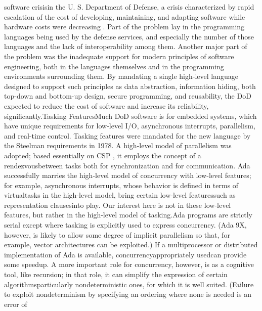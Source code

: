 \ldquo[]software crisis\rdquo[] in the U. S. Department of Defense,
a crisis characterized by rapid escalation of the cost of developing,
maintaining, and adapting software while hardware costs were decreasing
\Endcit[]. Part of the
problem lay in the programming languages being used by the defense
services, and especially the number of those languages and the lack
of interoperability among them. Another major part of the problem
was the inadequate support for modern principles of software engineering,
both in the languages themselves and in the programming environments
surrounding them. By mandating a single high-level language designed
to support such principles as data abstraction, information hiding,
both top-down and bottom-up design, secure programming, and reusability,
the DoD expected to reduce the cost of software and increase its reliability,
significantly.\Endpara[]
\DivLiv[]\HdMinLiv[]Tasking Features\HdMinEndiv[]
\Para[]Much DoD software is for embedded systems, which have unique
requirements for low-level I/O, asynchronous interrupts, parallelism,
and real-time control. Tasking features were mandated for the new
language by the Steelman requirements %
\Endcit[] in 1978. A high-level model of parallelism was adopted;
based essentially on CSP \Endcit[], it
employs the concept of a \txtxemph[]rendezvous\txtxendemph[] between
tasks both for synchronization and for communication. Ada successfully
marries the high-level model of concurrency with low-level features;
for example, asynchronous interrupts, whose behavior is defined in
terms of \ldquo[]virtual\rdquo[] tasks in the high-level model, bring
certain low-level features\EmDash[]such as representation clauses\EmDash[]into
play. Our interest here is not in these low-level features, but rather
in the high-level model of tasking.\Endpara[]
\Para[]Ada programs are strictly serial except where tasking is explicitly
used to express concurrency. (Ada 9X, however, is likely to allow
some degree of implicit parallelism so that, for example, vector architectures
can be exploited.) If a multiprocessor or distributed implementation
of Ada is available, concurrency\EmDash[]appropriately used\EmDash[]can
provide some speedup. A more important role for concurrency, however,
is as a cognitive tool, like recursion; in that role, it can simplify
the expression of certain algorithms\EmDash[]particularly nondeterministic
ones, for which it is well suited. (Failure to exploit nondeterminism
by specifying an ordering where none is needed is an error of %
